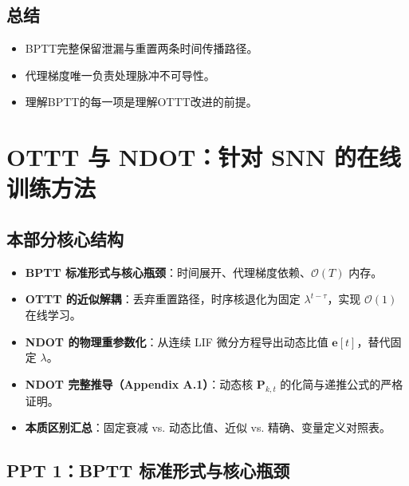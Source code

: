 \documentclass[journal,12pt,onecolumn]{IEEEtran}
\begin{document}
\subsection*{总结}
\begin{itemize}
    \item BPTT完整保留泄漏与重置两条时间传播路径。
    \item 代理梯度唯一负责处理脉冲不可导性。
    \item 理解BPTT的每一项是理解OTTT改进的前提。
\end{itemize}





\section{OTTT 与 NDOT：针对 SNN 的在线训练方法}


\subsection*{本部分核心结构}
\begin{itemize}[leftmargin=*, itemsep=0.3ex]
    \item[\textbf{1}] \textbf{BPTT 标准形式与核心瓶颈}：时间展开、代理梯度依赖、\(\mathcal{O}(T)\) 内存。
    \item[\textbf{2}] \textbf{OTTT 的近似解耦}：丢弃重置路径，时序核退化为固定 \(\lambda^{t-\tau}\)，实现 \(\mathcal{O}(1)\) 在线学习。
    \item[\textbf{3}] \textbf{NDOT 的物理重参数化}：从连续 LIF 微分方程导出动态比值 \(\mathbf{e}[t]\)，替代固定 \(\lambda\)。
    \item[\textbf{4}] \textbf{NDOT 完整推导（Appendix A.1）}：动态核 \(\mathbf{P}_{k,t}\) 的化简与递推公式的严格证明。
    \item[\textbf{5}] \textbf{本质区别汇总}：固定衰减 vs. 动态比值、近似 vs. 精确、变量定义对照表。
\end{itemize}
\vspace{0.3cm}

\subsection*{PPT 1：BPTT 标准形式与核心瓶颈}
\end{document}
